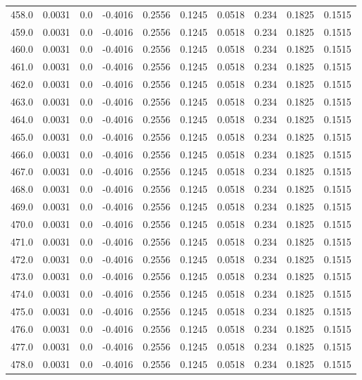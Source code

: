 \begin{longtable}{lrrrrrrrrr}
458.0 & 0.0031 & 0.0 & -0.4016 & 0.2556 & 0.1245 & 0.0518 & 0.234 & 0.1825 & 0.1515 \\
459.0 & 0.0031 & 0.0 & -0.4016 & 0.2556 & 0.1245 & 0.0518 & 0.234 & 0.1825 & 0.1515 \\
460.0 & 0.0031 & 0.0 & -0.4016 & 0.2556 & 0.1245 & 0.0518 & 0.234 & 0.1825 & 0.1515 \\
461.0 & 0.0031 & 0.0 & -0.4016 & 0.2556 & 0.1245 & 0.0518 & 0.234 & 0.1825 & 0.1515 \\
462.0 & 0.0031 & 0.0 & -0.4016 & 0.2556 & 0.1245 & 0.0518 & 0.234 & 0.1825 & 0.1515 \\
463.0 & 0.0031 & 0.0 & -0.4016 & 0.2556 & 0.1245 & 0.0518 & 0.234 & 0.1825 & 0.1515 \\
464.0 & 0.0031 & 0.0 & -0.4016 & 0.2556 & 0.1245 & 0.0518 & 0.234 & 0.1825 & 0.1515 \\
465.0 & 0.0031 & 0.0 & -0.4016 & 0.2556 & 0.1245 & 0.0518 & 0.234 & 0.1825 & 0.1515 \\
466.0 & 0.0031 & 0.0 & -0.4016 & 0.2556 & 0.1245 & 0.0518 & 0.234 & 0.1825 & 0.1515 \\
467.0 & 0.0031 & 0.0 & -0.4016 & 0.2556 & 0.1245 & 0.0518 & 0.234 & 0.1825 & 0.1515 \\
468.0 & 0.0031 & 0.0 & -0.4016 & 0.2556 & 0.1245 & 0.0518 & 0.234 & 0.1825 & 0.1515 \\
469.0 & 0.0031 & 0.0 & -0.4016 & 0.2556 & 0.1245 & 0.0518 & 0.234 & 0.1825 & 0.1515 \\
470.0 & 0.0031 & 0.0 & -0.4016 & 0.2556 & 0.1245 & 0.0518 & 0.234 & 0.1825 & 0.1515 \\
471.0 & 0.0031 & 0.0 & -0.4016 & 0.2556 & 0.1245 & 0.0518 & 0.234 & 0.1825 & 0.1515 \\
472.0 & 0.0031 & 0.0 & -0.4016 & 0.2556 & 0.1245 & 0.0518 & 0.234 & 0.1825 & 0.1515 \\
473.0 & 0.0031 & 0.0 & -0.4016 & 0.2556 & 0.1245 & 0.0518 & 0.234 & 0.1825 & 0.1515 \\
474.0 & 0.0031 & 0.0 & -0.4016 & 0.2556 & 0.1245 & 0.0518 & 0.234 & 0.1825 & 0.1515 \\
475.0 & 0.0031 & 0.0 & -0.4016 & 0.2556 & 0.1245 & 0.0518 & 0.234 & 0.1825 & 0.1515 \\
476.0 & 0.0031 & 0.0 & -0.4016 & 0.2556 & 0.1245 & 0.0518 & 0.234 & 0.1825 & 0.1515 \\
477.0 & 0.0031 & 0.0 & -0.4016 & 0.2556 & 0.1245 & 0.0518 & 0.234 & 0.1825 & 0.1515 \\
478.0 & 0.0031 & 0.0 & -0.4016 & 0.2556 & 0.1245 & 0.0518 & 0.234 & 0.1825 & 0.1515 \\

\end{longtable}
